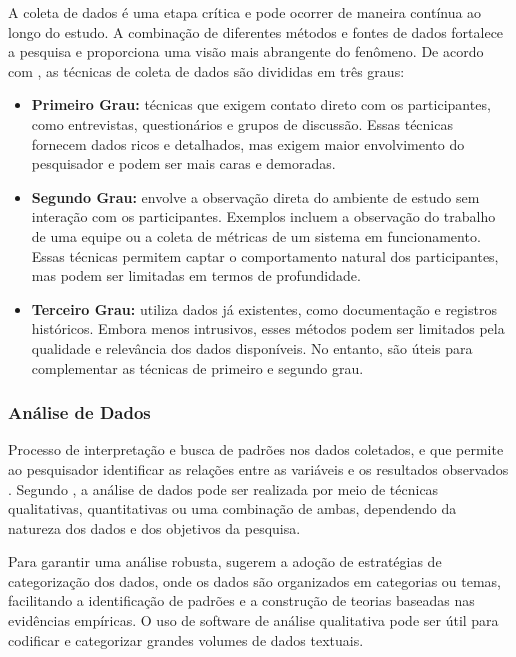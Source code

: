 A coleta de dados é uma etapa crítica e pode ocorrer de maneira contínua ao longo do estudo. A combinação de diferentes métodos e fontes de dados fortalece a pesquisa e proporciona uma visão mais abrangente do fenômeno. De acordo com ,  as técnicas de coleta de dados são divididas em três graus:

\begin{itemize}
    \item \textbf{Primeiro Grau:} técnicas que exigem contato direto com os participantes, como entrevistas, questionários e grupos de discussão. Essas técnicas fornecem dados ricos e detalhados, mas exigem maior envolvimento do pesquisador e podem ser mais caras e demoradas.
    
    \item \textbf{Segundo Grau:} envolve a observação direta do ambiente de estudo sem interação com os participantes. Exemplos incluem a observação do trabalho de uma equipe ou a coleta de métricas de um sistema em funcionamento. Essas técnicas permitem captar o comportamento natural dos participantes, mas podem ser limitadas em termos de profundidade.
    
    \item \textbf{Terceiro Grau:} utiliza dados já existentes, como documentação e registros históricos. Embora menos intrusivos, esses métodos podem ser limitados pela qualidade e relevância dos dados disponíveis. No entanto, são úteis para complementar as técnicas de primeiro e segundo grau.
\end{itemize}

\subsubsection{Análise de Dados}

Processo de interpretação e  busca de padrões nos dados coletados, e que permite ao pesquisador identificar as relações entre as variáveis e os resultados observados \cite{yin_case_study_2009}. Segundo , a análise de dados pode ser realizada por meio de técnicas qualitativas, quantitativas ou uma combinação de ambas, dependendo da natureza dos dados e dos objetivos da pesquisa.

Para garantir uma análise robusta,  sugerem a adoção de estratégias de categorização dos dados, onde os dados são organizados em categorias ou temas, facilitando a identificação de padrões e a construção de teorias baseadas nas evidências empíricas. O uso de software de análise qualitativa pode ser útil para codificar e categorizar grandes volumes de dados textuais.


